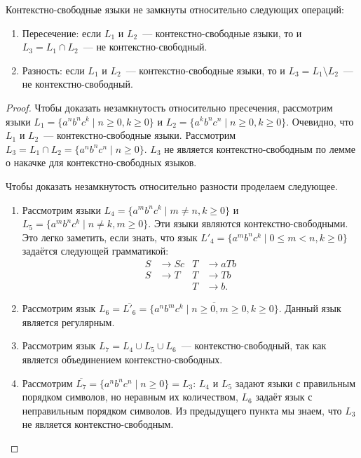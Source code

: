 \begin{theorem}
    Контекстно-свободные языки не замкнуты относительно следующих операций:
    \begin{enumerate}
        \item Пересечение: если $L_1$ и $L_2$~--- контекстно-свободные языки, то и $L_3 = L_1 \cap L_2$~--- не контекстно-свободный.
        \item Разность: если $L_1$ и $L_2$~--- контекстно-свободные языки, то и $L_3 = L_1 \setminus L_2$~--- не контекстно-свободный.
    \end{enumerate}
\end{theorem}

\begin{proof}
    Чтобы доказать незамкнутость относительно пресечения, рассмотрим языки $L_1 = \{a^n b^n c^k \mid n \geq 0, k \geq 0\}$ и $L_2 = \{a^k b^n c^n \mid n \geq 0, k \geq 0\}$.
    Очевидно, что $L_1$ и $L_2$~--- контекстно-свободные языки.
    Рассмотрим $L_3 = L_1 \cap L_2 = \{a^n b^n c^n \mid n \geq 0\}$.
    $L_3$ не является контекстно-свободным по лемме о накачке для контекстно-свободных языков.

    Чтобы доказать незамкнутость относительно разности проделаем следующее.
    \begin{enumerate}
        \item Рассмотрим языки $L_4 = \{a^m b^n c^k \mid m \neq n, k \geq 0\}$ и $L_5 = \{a^m b^n c^k \mid n \neq k, m \geq 0\}$.
              Эти языки являются контекстно-свободными.
              Это легко заметить, если знать, что язык $L'_4 = \{a^m b^n c^k \mid 0 \leq m < n, k \geq 0\}$ задаётся следующей грамматикой:
              \begin{align*}
                  S & \to S c & T & \to a T b \\
                  S & \to T   & T & \to T b   \\
                    &         & T & \to b.
              \end{align*}
        \item Рассмотрим язык $L_6 = \overline{L'_6} = \overline{\{a^n b^m c^k \mid n \geq 0, m \geq 0, k \geq 0\}}$.
              Данный язык является регулярным.
        \item Рассмотрим язык $L_7 = L_4 \cup L_5 \cup L_6$~--- контекстно-свободный, так как является объединением контекстно-свободных.
        \item Рассмотрим $\overline{L_7} = \{a^n b^n c^n \mid n \geq 0\} = L_3$: $L_4$ и $L_5$ задают языки с правильным порядком символов, но неравным их количеством, $L_6$ задаёт язык с неправильным порядком символов.
              Из предыдущего пункта мы знаем, что $L_3$  не является контекстно-свободным.
              \qedhere
    \end{enumerate}
\end{proof}




